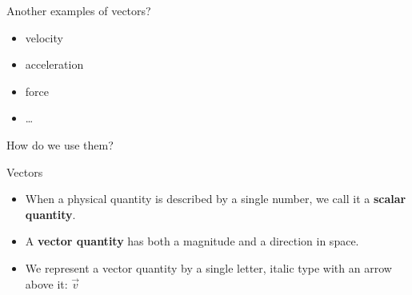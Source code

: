 \documentclass[]{beamer}
\begin{document}
\begin{frame}
   Another examples of vectors? \pause

   \begin{itemize}
      \item velocity
      \item acceleration
      \item force 
      \item \dots
   \end{itemize}

   \pause

How do we use them?
      
\end{frame}



     \begin{frame}
      Vectors
      
      \begin{itemize}
      \item When a physical quantity is described by a single number, we call it a \textbf{scalar
      quantity}.
      \pause
      \item A \textbf{vector quantity} has both a magnitude and a direction in space.
      \pause 
      \item We represent a vector quantity  by a single letter, italic type with an arrow above it:  $\vec{v}$
      \end{itemize}
      
      
      
       \end{frame}
      
\end{document}
